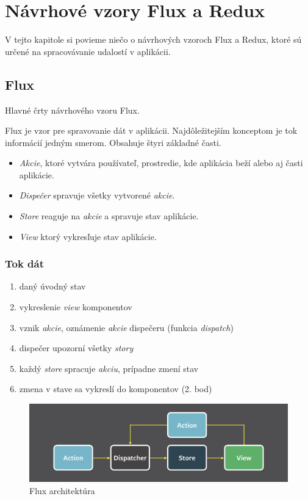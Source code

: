 \chapter{Návrhové vzory Flux a Redux}

\label{kap:vzory} %

V tejto kapitole si povieme niečo o návrhových vzoroch Flux a Redux, ktoré sú určené na spracovávanie udalostí v aplikácii.

\section{Flux}
Hlavné črty návrhového vzoru Flux. \cite[Overview]{Flux} \TODO{}

Flux je vzor pre spravovanie dát v aplikácii. Najdôležitejším konceptom je tok informácií jedným smerom. Obsahuje štyri základné časti. 
\begin{itemize}
\item \emph{Akcie}, ktoré vytvára používateľ, prostredie, kde aplikácia beží alebo aj časti aplikácie. 
\item \emph{Dispečer} spravuje všetky vytvorené \emph{akcie}. 
\item \emph{Store} reaguje na \emph{akcie} a spravuje stav aplikácie.
\item \emph{View} ktorý vykresľuje stav aplikácie.
\end{itemize}

\subsection{Tok dát}%
\begin{enumerate}
\item daný úvodný stav
\item vykreslenie \emph{view} komponentov
\item vznik \emph{akcie}, oznámenie \emph{akcie} dispečeru (funkcia \emph{dispatch})
\item dispečer upozorní všetky \emph{story}
\item každý \emph{store} spracuje \emph{akciu}, prípadne zmení stav
\item zmena v stave sa vykreslí do komponentov (2. bod)
\end{enumerate}


\begin{figure}
  \centering
    \includegraphics[width=\textwidth]{./images/flux.png}
  \caption{Flux architektúra}
\end{figure}

